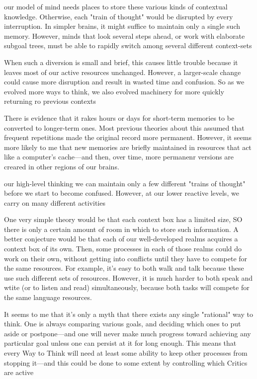 \documentclass[10pt,a4paper]{article}
\begin{document}
our model of mind needs places to store these various kinds of contextual knowledge. Otherwise, each "train of thought" would be disrupted by every interruption. In simpler brains, it might suffice to maintain only a single such memory. However, minds that look several steps ahead, or work with elaborate subgoal trees, must be able to rapidly switch among several different context-sets \cite[p.~242]{minsky}

When such a diversion is small and brief, this causes little trouble because it leaves most of our active resources unchanged. However, a larger-scale change could cause more disruption and result in wasted time and confusion. So as we evolved more ways to think, we also evolved machinery for more quickly returning ro previous contexts \cite[p.~244]{minsky}

There is evidence that it rakes hours or days for short-term memories to be converted to longer-term ones. Most previous theories about this assumed that frequent repetitions made the original record more permanent. However, it seems more likely to me that new memories are briefly maintained in resources that act like a computer's cache—and then, over time, more permanenr versions are creared in other regions of our brains. \cite[p.~245]{minsky}

our high-level thinking we can maintain only a few different "trains of thought" before we start to become confused. However, at our lower reactive levels, we carry on many different activities \cite[p.~247]{minsky}

One very simple theory would be that each context box has a limited size, SO there is only a certain amount of room in which to store such information. A better conjecture would be that each of our well-developed realms acquires a context box of its own. Then, some processes in each of those realms could do work on their own, without getting into conflicts until they have to compete for the same resources.
For example, it's easy to both walk and talk because these use such different sets of resources. However, it is much harder to both speak and wtite (or to listen and read) simultaneously, because both tasks will compete for the same language resources. \cite[p.~248]{minsky}

It seems to me that it's only a myth that there exists any single "rational" way to think. One is always comparing various goals, and deciding which ones to put aside or postpone—and one will never make much progress toward achieving any particular goal unless one can persist at it for long enough. This means that every Way to Think will need at least some ability to keep other processes from stopping it—and this could be done to some extent by controlling which Critics are active \cite[p.~249]{minsky}
\end{document}
